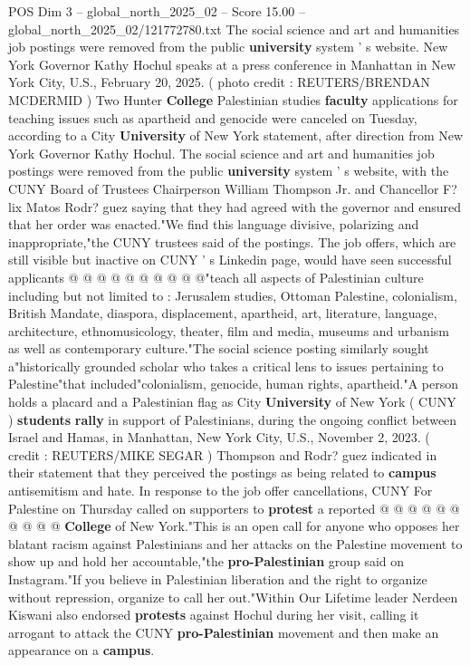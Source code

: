 \begin{textsample}{POS Dim 3 – global\_north\_2025\_02 – Score 15.00 – global\_north\_2025\_02/121772780.txt}  \label{ex:f3_pos_295}
The social science and art and humanities job postings were removed from the public \textbf{university} system ' s website.
New York Governor Kathy Hochul speaks at a press conference in Manhattan in New York City, U.S., February 20, 2025. ( photo credit : REUTERS/BRENDAN MCDERMID ) Two Hunter \textbf{College} Palestinian studies \textbf{faculty} applications for teaching issues such as apartheid and genocide were canceled on Tuesday, according to a City \textbf{University} of New York statement, after direction from New York Governor Kathy Hochul.
The social science and art and humanities job postings were removed from the public \textbf{university} system ' s website, with the CUNY Board of Trustees Chairperson William Thompson Jr. and Chancellor F? lix Matos Rodr? guez saying that they had agreed with the governor and ensured that her order was enacted."We find this language divisive, polarizing and inappropriate,"the CUNY trustees said of the postings.
The job offers, which are still visible but inactive on CUNY ' s Linkedin page, would have seen successful applicants @ @ @ @ @ @ @ @ @ @"teach all aspects of Palestinian culture including but not limited to : Jerusalem studies, Ottoman Palestine, colonialism, British Mandate, diaspora, displacement, apartheid, art, literature, language, architecture, ethnomusicology, theater, film and media, museums and urbanism as well as contemporary culture."The social science posting similarly sought a"historically grounded scholar who takes a critical lens to issues pertaining to Palestine"that included"colonialism, genocide, human rights, apartheid."A person holds a placard and a Palestinian flag as City \textbf{University} of New York ( CUNY ) \textbf{students} \textbf{rally} in support of Palestinians, during the ongoing conflict between Israel and Hamas, in Manhattan, New York City, U.S., November 2, 2023. ( credit : REUTERS/MIKE SEGAR ) Thompson and Rodr? guez indicated in their statement that they perceived the postings as being related to \textbf{campus} antisemitism and hate.
In response to the job offer cancellations, CUNY For Palestine on Thursday called on supporters to \textbf{protest} a reported @ @ @ @ @ @ @ @ @ @ \textbf{College} of New York."This is an open call for anyone who opposes her blatant racism against Palestinians and her attacks on the Palestine movement to show up and hold her accountable,"the \textbf{pro-Palestinian} group said on Instagram."If you believe in Palestinian liberation and the right to organize without repression, organize to call her out."Within Our Lifetime leader Nerdeen Kiswani also endorsed \textbf{protests} against Hochul during her visit, calling it arrogant to attack the CUNY \textbf{pro-Palestinian} movement and then make an appearance on a \textbf{campus}.

\end{textsample}
